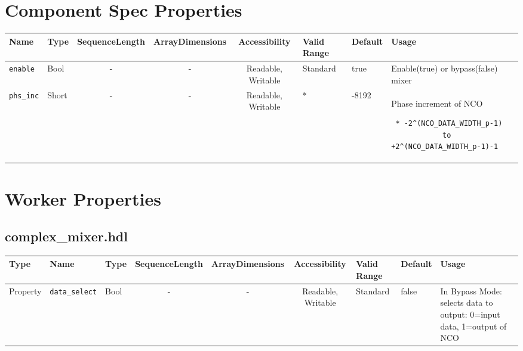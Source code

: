 \documentclass{article}
\def\comp{complex\_mixer}
\begin{document}
\begin{landscape}
	\section*{Component Spec Properties}
	\begin{scriptsize}
		\begin{tabular}{|p{3cm}|p{1.5cm}|c|c|c|p{1.5cm}|p{1cm}|p{7cm}|}
			\hline
			\rowcolor{blue}
			Name               & Type   & SequenceLength & ArrayDimensions & Accessibility      & Valid Range & Default & Usage                                                                         \\
			\hline
			\verb+enable+      & Bool   & -              & -               & Readable, Writable & Standard    & true    & Enable(true) or bypass(false) mixer                                           \\
			\hline
			\verb+phs_inc+     & Short  & -              & -               & Readable, Writable & *           & -8192   & Phase increment of NCO \scriptsize\begin{verbatim} * -2^(NCO_DATA_WIDTH_p-1)
			to +2^(NCO_DATA_WIDTH_p-1)-1\end{verbatim}\\
			\hline

		\end{tabular}
	\end{scriptsize}

	\section*{Worker Properties}
	\subsection*{\comp.hdl}
	\begin{scriptsize}
		\begin{tabular}{|p{1.5cm}|p{2.5cm}|p{1cm}|c|c|c|p{2cm}|p{1cm}|p{5cm}|}
			\hline
			\rowcolor{blue}
			Type     & Name                      & Type  & SequenceLength & ArrayDimensions & Accessibility       & Valid Range & Default & Usage                                      \\
			\hline
			Property & \verb+data_select+     & Bool  & -              & -               & Readable, Writable & Standard    & false    & In Bypass Mode: selects data to output: 0=input data, 1=output of NCO   \\
			\hline
		\end{tabular}
	\end{scriptsize}


\end{landscape}
\end{document}

